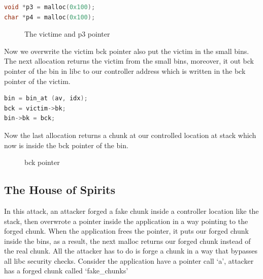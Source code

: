 \documentclass{masterthesis}
\newcommand*\sbs{small bins}
\begin{document}
\begin{lstlisting}[language=c,frame=tlrb]
void *p3 = malloc(0x100);
char *p4 = malloc(0x100);
\end{lstlisting}

\begin{figure}[h!]
  \caption{The victime and p3 pointer}
\end{figure}

Now we overwrite the victim bck pointer also put the victim in the \sbs{}. The next allocation returns the victim from the \sbs{}, moreover, it out bck pointer of the bin in libc to our controller address which is written in the bck pointer of the victim.

\begin{lstlisting}[language=c,frame=tlrb]
bin = bin_at (av, idx);
bck = victim->bk;
bin->bk = bck;
\end{lstlisting}

Now the last allocation returns a chunk at our controlled location at stack which now is inside the bck pointer of the bin. 

\begin{figure}[h!]
  \caption{bck pointer}
\end{figure}

\subsection{The House of Spirits}
In this attack, an attacker forged a fake chunk inside a controller location like the stack, then overwrote a pointer inside the application in a way pointing to the forged chunk. When the application frees the pointer, it puts our forged chunk inside the bins, as a result, the next malloc returns our forged chunk instead of the real chunk. All the attacker has to do is forge a chunk in a way that bypasses all libc security checks. Consider the application have a pointer call ‘a’, attacker has a forged chunk called ‘fake\_chunks’
\end{document}
